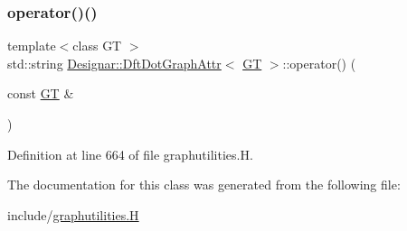 \subsubsection{\texorpdfstring{operator()()}{operator()()}}
{\footnotesize\ttfamily template$<$class GT $>$ \\
std\+::string \hyperlink{class_designar_1_1_dft_dot_graph_attr}{Designar\+::\+Dft\+Dot\+Graph\+Attr}$<$ \hyperlink{demo-buildgraph_8_c_a3001c40d2c31ca87ed96cd7d1334a55e}{GT} $>$\+::operator() (\begin{DoxyParamCaption}\item[{const \hyperlink{demo-buildgraph_8_c_a3001c40d2c31ca87ed96cd7d1334a55e}{GT} \&}]{ }\end{DoxyParamCaption})\hspace{0.3cm}{\ttfamily [inline]}}



Definition at line 664 of file graphutilities.\+H.



The documentation for this class was generated from the following file\+:\begin{DoxyCompactItemize}
\item 
include/\hyperlink{graphutilities_8_h}{graphutilities.\+H}\end{DoxyCompactItemize}
